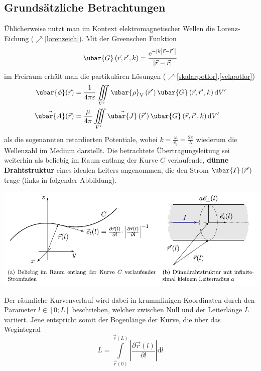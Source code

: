 \subsection{Grundsätzliche Betrachtungen}
Üblicherweise nutzt man im Kontext elektromagnetischer Wellen die Lorenz-Eichung ($\nearrow$\ref{lorenzeich}). Mit der Greenschen Funktion 
\begin{equation}
	\ubar{G}\left(\vec{r}, \vec{r}^{\prime}, k\right)=\frac{\mathrm{e}^{-\mathrm{j} k\left|\vec{r}-\vec{r}^{\prime}\right|}}{|\vec{r}-\vec{r}|} 
\end{equation}
im Freiraum erhält man die partikulären Lösungen ($\nearrow$\ref{skalarpotlor},\ref{vekpotlor})
\begin{align}
	\ubar{\phi}(\vec{r}) & =\frac{1}{4 \pi \varepsilon} \iiint\limits_{V^{\prime}} \ubar{\rho}_{\mathrm{V}}\left(\vec{r}^{\prime}\right) \ubar{G}\left(\vec{r}, \vec{r}^{\prime}, k\right) \mathrm{d} V^{\prime} \label{partLT1}  \\
	\vec{\ubar{A}}(\vec{r}) & =\frac{\mu}{4 \pi} \iiint\limits_{V^{\prime}} \vec{\ubar{J}}\left(\vec{r}^{\prime}\right) \ubar{G}\left(\vec{r}, \vec{r}^{\prime}, k\right) \mathrm{d} V^{\prime}  \label{partLT2}
\end{align}
als die sogenannten retardierten Potentiale, wobei $k=\frac{\omega}{v_\mathrm{c}}=\frac{2 \pi}{\lambda}$ wiederum die Wellenzahl im Medium darstellt. Die betrachtete Übertragungsleitung sei weiterhin als beliebig im Raum entlang der Kurve $C$ verlaufende, \textbf{dünne Drahtstruktur} eines idealen Leiters angenommen, die den Strom $\ubar{I}\left(\vec{r}^{\prime}\right)$ trage (links in folgender Abbildung).
\begin{center}
\includegraphics{res/LT16}
\end{center}
Der räumliche Kurvenverlauf wird dabei in krummlinigen Koordinaten durch den Parameter $l \in[0 ; L]$ beschrieben, welcher zwischen Null und der Leiterlänge $L$ variiert. Jene entspricht somit der Bogenlänge der Kurve, die über das Wegintegral
\begin{equation}
	L=\int\limits_{\vec{r}(0)}^{\vec{r}(L)}\left|\frac{\partial \vec{r}(l)}{\partial l}\right| \mathrm{d} l 
\end{equation}
